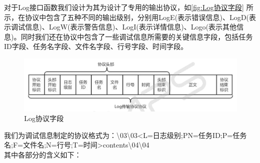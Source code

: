 对于Log接口函数我们设计为其为设计了专用的输出协议，如\autoref{fig:Log协议字段} 所示，在协议中包含了五种不同的输出级别，分别用LogE(表示错误信息)、LogD(表示调试信息)、LogW(表示警告信息)、LogI(表示详情信息)、Logo(表示其他信息)。同时我们还在协议中包含了一些调试信息所需要的关键信息字段，包括任务ID字段、任务名字段、文件名字段、行号字段、时间字段。
\begin{figure}[!h]
\centering
\includegraphics[width=.9\textwidth]{./graphics/Logxieyi.pdf}
\caption{Log协议字段}\label{fig:Log协议字段}
\end{figure}

我们为调试信息制定的协议格式为：\backslash 03\backslash 03<L=日志级别;PN=任务ID;P=任务名;F=文件名;N=行号;T=时间>contents\backslash 04\backslash 04\\
其中各部分的含义如下：

